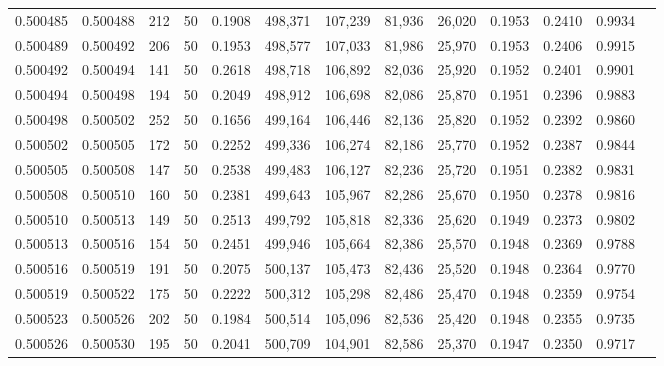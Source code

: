 \begin{tabular}{rrrrrrrrrrrrr}
0.500485 & 0.500488 & 212 &  50 &                                     0.1908 & 498,371 & 107,239 &  81,936 &  26,020 & 0.1953 & 0.2410 & 0.9934 \\
0.500489 & 0.500492 & 206 &  50 &                                     0.1953 & 498,577 & 107,033 &  81,986 &  25,970 & 0.1953 & 0.2406 & 0.9915 \\
0.500492 & 0.500494 & 141 &  50 &                                     0.2618 & 498,718 & 106,892 &  82,036 &  25,920 & 0.1952 & 0.2401 & 0.9901 \\
0.500494 & 0.500498 & 194 &  50 &                                     0.2049 & 498,912 & 106,698 &  82,086 &  25,870 & 0.1951 & 0.2396 & 0.9883 \\
0.500498 & 0.500502 & 252 &  50 &                                     0.1656 & 499,164 & 106,446 &  82,136 &  25,820 & 0.1952 & 0.2392 & 0.9860 \\
0.500502 & 0.500505 & 172 &  50 &                                     0.2252 & 499,336 & 106,274 &  82,186 &  25,770 & 0.1952 & 0.2387 & 0.9844 \\
0.500505 & 0.500508 & 147 &  50 &                                     0.2538 & 499,483 & 106,127 &  82,236 &  25,720 & 0.1951 & 0.2382 & 0.9831 \\
0.500508 & 0.500510 & 160 &  50 &                                     0.2381 & 499,643 & 105,967 &  82,286 &  25,670 & 0.1950 & 0.2378 & 0.9816 \\
0.500510 & 0.500513 & 149 &  50 &                                     0.2513 & 499,792 & 105,818 &  82,336 &  25,620 & 0.1949 & 0.2373 & 0.9802 \\
0.500513 & 0.500516 & 154 &  50 &                                     0.2451 & 499,946 & 105,664 &  82,386 &  25,570 & 0.1948 & 0.2369 & 0.9788 \\
0.500516 & 0.500519 & 191 &  50 &                                     0.2075 & 500,137 & 105,473 &  82,436 &  25,520 & 0.1948 & 0.2364 & 0.9770 \\
0.500519 & 0.500522 & 175 &  50 &                                     0.2222 & 500,312 & 105,298 &  82,486 &  25,470 & 0.1948 & 0.2359 & 0.9754 \\
0.500523 & 0.500526 & 202 &  50 &                                     0.1984 & 500,514 & 105,096 &  82,536 &  25,420 & 0.1948 & 0.2355 & 0.9735 \\
0.500526 & 0.500530 & 195 &  50 &                                     0.2041 & 500,709 & 104,901 &  82,586 &  25,370 & 0.1947 & 0.2350 & 0.9717 \\

\end{tabular}
